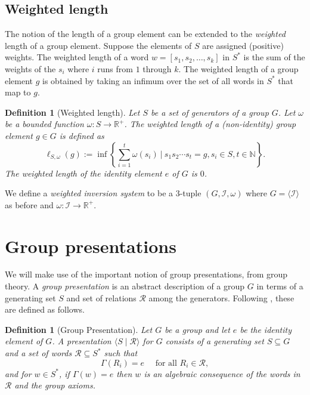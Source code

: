 \documentclass[utf8]{Frontiers_LaTex_Templates/frontiersFPHY} %
\newcommand{\invset}{\mathcal{I}}
\newcommand{\id}{e}
\newcommand{\N}{\mathbb N}
\newcommand{\newl}{\ell}
\numberwithin{equation}{section}
\newtheorem{definition}[prop]{Definition}
\begin{document}
\subsection*{Weighted length}
The notion of the length of a group element can be extended to the \emph{weighted} length of a group element. Suppose the elements of $S$ are assigned (positive) weights. The weighted length of a word $w = [s_1, s_2,  \dots ,s_k]$ in $S^*$ is the sum of the weights of the $s_i$ where $i$ runs from $1$ through $k$. The weighted length of a group element $g$ is obtained by taking an infimum over the set of all words in $S^*$ that map to $g$.

\begin{definition}[Weighted length]
\label{def:wwl}
Let $S$ be a set of generators of a group $G$. Let $\omega$ be a bounded function $\omega:S \rightarrow \mathbb{R}^+$. The weighted length of a (non-identity) group element $g \in G$ is defined as 
\[
\newl_{S,\omega}(g):= 
\inf \left\{ \sum_{i=1}^{t}{\omega(s_i)}\ \Big\vert\  s_1 s_2  \cdots s_t = g, s_i \in S,t\in\N\right\}.
\]
The weighted length of the identity element $e$ of $G$ is $0$. 
\end{definition}

We define a \emph{weighted inversion system} to be a 3-tuple $(G, \invset, \omega)$ where $G = \langle \invset \rangle$ as before and $\omega : \invset \rightarrow \mathbb{R}^+$.  

\section{Group presentations}\label{sec:grppresent}

We will make use of the important notion of group presentations, from group theory. A \emph{group presentation} is an abstract description of a group $G$ in terms of a generating set $S$ and set of relations $\mathcal{R}$ among the generators. Following \citet[Chapter 1]{coxeter1980generators}, these are defined as follows.


\begin{definition}[Group Presentation]
Let $G$ be a group and let $\id$ be the identity element of $G$.
A \emph{presentation} $\langle S \mid \mathcal{R} \rangle$ for $G$ consists of a generating set $S \subseteq G$ and a set of words $\mathcal{R} \subseteq S^*$ such that
\[ \Gamma(R_i) = \id \quad \text{ for all } R_i \in \mathcal{R}, \] 
and for $w \in S^*$, if $\Gamma(w)  = \id$ then $w$ is an \emph{algebraic consequence} of the words in $\mathcal{R}$ and the group axioms.
\end{definition}
\end{document}
